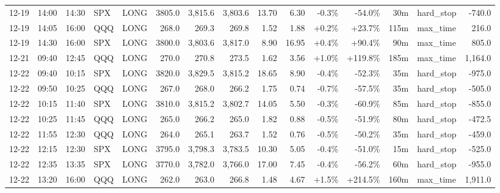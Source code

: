 \documentclass[11pt,a4paper,twoside]{article}
\begin{document}
\begin{landscape}
\begin{center}
\begin{longtable}{>{\color{txtmain}}l l l l l r r r r r r r r >{\color{txtmain}}l r}
12-19 & 14:00 & 14:30 & SPX & LONG & 3805.0 & 3,815.6 & 3,803.6 & 13.70 & 6.30 & \textcolor{lossred}{-0.3\%} & \textcolor{lossred}{-54.0\%} & 30m & hard\_stop & \textcolor{lossred}{-740.0} \\
12-19 & 14:05 & 16:00 & QQQ & LONG & 268.0 & 269.3 & 269.8 & 1.52 & 1.88 & \textcolor{wingreen}{+0.2\%} & \textcolor{wingreen}{+23.7\%} & 115m & max\_time & \textcolor{wingreen}{216.0} \\
12-19 & 14:30 & 16:00 & SPX & LONG & 3800.0 & 3,803.6 & 3,817.0 & 8.90 & 16.95 & \textcolor{wingreen}{+0.4\%} & \textcolor{wingreen}{+90.4\%} & 90m & max\_time & \textcolor{wingreen}{805.0} \\
12-21 & 09:40 & 12:45 & QQQ & LONG & 270.0 & 270.8 & 273.5 & 1.62 & 3.56 & \textcolor{wingreen}{+1.0\%} & \textcolor{wingreen}{+119.8\%} & 185m & max\_time & \textcolor{wingreen}{1,164.0} \\
12-22 & 09:40 & 10:15 & SPX & LONG & 3820.0 & 3,829.5 & 3,815.2 & 18.65 & 8.90 & \textcolor{lossred}{-0.4\%} & \textcolor{lossred}{-52.3\%} & 35m & hard\_stop & \textcolor{lossred}{-975.0} \\
12-22 & 09:50 & 10:25 & QQQ & LONG & 267.0 & 268.0 & 266.2 & 1.75 & 0.74 & \textcolor{lossred}{-0.7\%} & \textcolor{lossred}{-57.5\%} & 35m & hard\_stop & \textcolor{lossred}{-505.0} \\
12-22 & 10:15 & 11:40 & SPX & LONG & 3810.0 & 3,815.2 & 3,802.7 & 14.05 & 5.50 & \textcolor{lossred}{-0.3\%} & \textcolor{lossred}{-60.9\%} & 85m & hard\_stop & \textcolor{lossred}{-855.0} \\
12-22 & 10:25 & 11:45 & QQQ & LONG & 265.0 & 266.2 & 265.0 & 1.82 & 0.88 & \textcolor{lossred}{-0.5\%} & \textcolor{lossred}{-51.9\%} & 80m & hard\_stop & \textcolor{lossred}{-472.5} \\
12-22 & 11:55 & 12:30 & QQQ & LONG & 264.0 & 265.1 & 263.7 & 1.52 & 0.76 & \textcolor{lossred}{-0.5\%} & \textcolor{lossred}{-50.2\%} & 35m & hard\_stop & \textcolor{lossred}{-459.0} \\
12-22 & 12:15 & 12:30 & SPX & LONG & 3795.0 & 3,798.3 & 3,783.5 & 10.30 & 5.05 & \textcolor{lossred}{-0.4\%} & \textcolor{lossred}{-51.0\%} & 15m & hard\_stop & \textcolor{lossred}{-525.0} \\
12-22 & 12:35 & 13:35 & SPX & LONG & 3770.0 & 3,782.0 & 3,766.0 & 17.00 & 7.45 & \textcolor{lossred}{-0.4\%} & \textcolor{lossred}{-56.2\%} & 60m & hard\_stop & \textcolor{lossred}{-955.0} \\
12-22 & 13:20 & 16:00 & QQQ & LONG & 262.0 & 263.0 & 266.8 & 1.48 & 4.67 & \textcolor{wingreen}{+1.5\%} & \textcolor{wingreen}{+214.5\%} & 160m & max\_time & \textcolor{wingreen}{1,911.0} \\

\end{longtable}
\end{center}
\end{landscape}
\end{document}
